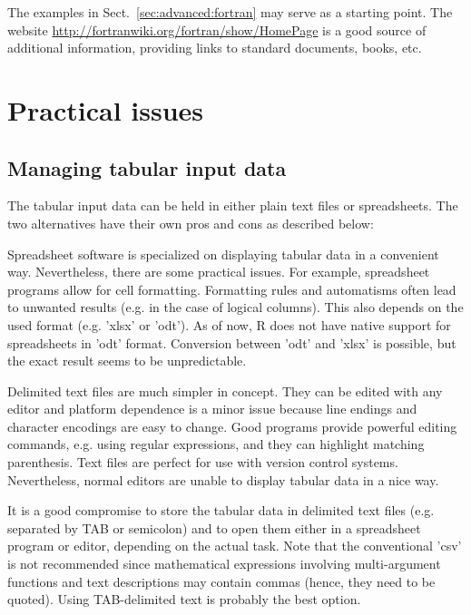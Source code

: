 \documentclass[times,onecolumn]{article}
\begin{document}
The examples in Sect.~\ref{sec:advanced:fortran} may serve as a starting point. The website \url{http://fortranwiki.org/fortran/show/HomePage} is a good source of additional information, providing links to standard documents, books, etc.


\section{Practical issues} \label{sec:practical}

\subsection{Managing tabular input data}

The tabular input data can be held in either plain text files or spreadsheets. The two alternatives have their own pros and cons as described below:

Spreadsheet software is specialized on displaying tabular data in a convenient way. Nevertheless, there are some practical issues. For example, spreadsheet programs allow for cell formatting. Formatting rules and automatisms often lead to unwanted results (e.g. in the case of logical columns). This also depends on the used format (e.g. 'xlsx' or 'odt'). As of now, R does not have native support for spreadsheets in 'odt' format. Conversion between 'odt' and 'xlsx' is possible, but the exact result seems to be unpredictable.

Delimited text files are much simpler in concept. They can be edited with any editor and platform dependence is a minor issue because line endings and character encodings are easy to change. Good programs provide powerful editing commands, e.g. using regular expressions, and they can highlight matching parenthesis. Text files are perfect for use with version control systems. Nevertheless, normal editors are unable to display tabular data in a nice way.

It is a good compromise to store the tabular data in delimited text files (e.g. separated by TAB or semicolon) and to open them either in a spreadsheet program or editor, depending on the actual task. Note that the conventional 'csv' is not recommended since mathematical expressions involving multi-argument functions and text descriptions may contain commas (hence, they need to be quoted). Using TAB-delimited text is probably the best option.
\end{document}
